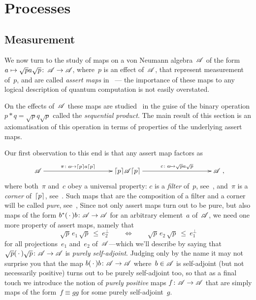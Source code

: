 \documentclass[a]{subfiles}
\begin{document}
\chapter{Processes}
\section{Measurement}
\begin{parsec}
\begin{point}%
We now turn to the study of
maps on a von Neumann algebra~$\mathscr{A}$
of the form
$a\mapsto \sqrt{p}a\sqrt{p}\colon\,\mathscr{A}\to\mathscr{A}$,
where~$p$ is an effect of~$\mathscr{A}$,
that represent measurement of~$p$,
and are called \emph{assert maps} in~
--- the importance of these maps 
to any logical description of
quantum computation is not easily overstated.

On the effects of~$\mathscr{A}$
these maps are studied~ in the guise
of the binary operation
$p\ast q=\sqrt{p} q \sqrt{p}$
called the \emph{sequential product}.
The main result of this section
is an axiomatisation of this operation
in terms of properties
of the underlying assert maps.

Our first observation
to this end
is that any assert map factors as
\begin{equation*}
\xymatrix@C=10em{
\scrA
\ar[r]^-{\pi\colon a\mapsto \ceil{p}a\ceil{p}}
&
\ceil{p}\!\scrA\!\ceil{p}
\ar[r]^-{c\colon a\mapsto \sqrt{p}a\sqrt{p}}
&
\scrA
},
\end{equation*}
where both~$\pi$ and~$c$ obey a universal property:
$c$ is a \emph{filter} of~$p$, see~,
and~$\pi$ is a \emph{corner} of~$\left\lceil p\right\rceil$, see~.
Such maps
that are the composition of a filter and a corner
will be called \emph{pure}, see~,
Since not only assert maps turn out to be pure, but also maps of the form
$b^*(\,\cdot\,)b\colon \mathscr{A}\to\mathscr{A}$ for an arbitrary element~$a$
of~$\mathscr{A}$,
we need one more property of assert maps, namely
that
\begin{equation*}
	\sqrt{p}\,e_1\,\sqrt{p}\ \leq\  e_2^\perp 
	\qquad\iff\qquad
	\sqrt{p}\,e_2 \,\sqrt{p}\ \leq\  e_1^\perp
\end{equation*}
for all projections~$e_1$ and~$e_2$ of~$\mathscr{A}$---which we'll
describe by saying that $\sqrt{p}(\,\cdot\,)\sqrt{p}\colon \mathscr{A}\to\mathscr{A}$
is \emph{purely self-adjoint}.
Judging only by the name
it may not surprise you that the map $b(\,\cdot\,)b\colon \mathscr{A}\to\mathscr{A}$
where~$b\in \mathscr{A}$ is self-adjoint (but not necessarily positive)
turns out to be purely self-adjoint too,
so that as a final touch we introduce the notion
of \emph{purely positive} maps $f\colon \mathscr{A}\to\mathscr{A}$
that are simply maps of the form~$f\equiv gg$ for some purely self-adjoint~$g$.


\end{point}
\end{parsec}
\end{document}
